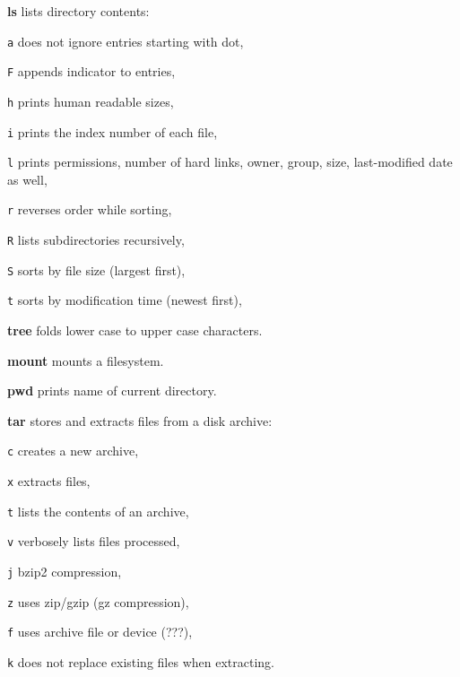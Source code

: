\begin{enumx}
	\item [\cmd] \textbf{ls} lists directory contents:
	\item [\texttt{a}] does not ignore entries starting with dot, 
	\item [\texttt{F}] appends indicator to entries, 
	\item [\texttt{h}] prints human readable sizes, 
	\item [\texttt{i}] prints the index number of each file, 
	\item [\texttt{l}] prints permissions, number of hard links, owner, group, size, last-modified date as well, 
	\item [\texttt{r}] reverses order while sorting,
	\item [\texttt{R}] lists subdirectories recursively, 
	\item [\texttt{S}] sorts by file size (largest first), 
	\item [\texttt{t}] sorts by modification time (newest first), 
	\item [\cmd] \textbf{tree} folds lower case to upper case characters.
\end{enumx}

\begin{enumx}
	\item [\cmd] \textbf{mount} mounts a filesystem.
\end{enumx}

\begin{enumx}
	\item [\cmd] \textbf{pwd} prints name of current directory.
\end{enumx}

\begin{enumx}
	\item [\cmd] \textbf{tar} stores and extracts files from a disk archive:
	\item [\texttt{c}] creates a new archive,
	\item [\texttt{x}] extracts files,
	\item [\texttt{t}] lists the contents of an archive,
	\item [\texttt{v}] verbosely lists files processed,
	\item [\texttt{j}] bzip2 compression,
	\item [\texttt{z}] uses zip/gzip (gz compression),
	\item [\texttt{f}] uses archive file or device (???),
	\item [\texttt{k}] does not replace existing files when extracting.
\end{enumx}


